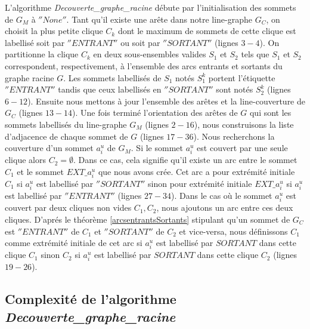 L'algorithme {\em Decouverte\_graphe\_racine} d\'ebute par l'initialisation des sommets de $G_M$ \`a $''None''$.
Tant qu'il existe une ar\^ete dans notre line-graphe $G_C$, on choisit la plus petite clique $C_k$ dont le maximum de sommets de cette clique est labellis\'e soit par $''ENTRANT''$ ou soit par $''SORTANT''$ (lignes $3-4$).
On partitionne la clique $C_k$  en deux sous-ensembles valides $S_1$ et $S_2$ tels que $S_1$ et $S_2$ correspondent, respectivement, \`a l'ensemble des arcs entrants et sortants du graphe racine $G$.
Les sommets labellis\'es de $S_1$ not\'es $S_1^k$ portent l'\'etiquette $''ENTRANT''$ tandis que ceux labellis\'es en $''SORTANT''$ sont not\'es $S_2^k$ (lignes $6-12$). 
Ensuite nous mettons \`a jour l'ensemble des ar\^etes et la line-couverture de $G_C$ (lignes $13-14$). 
\newline
Une fois termin\'e l'orientation des ar\^etes de $G$ qui  sont les sommets labellis\'es du line-graphe $G_M$ (lignes $2-16$), nous construisons la liste d'adjacence de chaque sommet de $G$ (lignes $17-36$).
Nous recherchons la couverture d'un sommet $a_i^u$ de $G_M$.
\newline 
Si le sommet  $a_i^u$ est couvert par une seule clique alors $C_2 = \emptyset$. Dans ce cas, cela signifie qu'il existe un arc entre le sommet $C_1$ et le sommet $EXT\_a_i^u$ que nous avons cr\'ee. Cet arc a pour extr\'emit\'e initiale $C_1$ si $a_i^u$ est labellis\'e par $''SORTANT''$ sinon pour extr\'emit\'e initiale $EXT\_a_i^u$ si $a_i^u$ est labellis\'e par $''ENTRANT''$ (lignes $27-34$).
\newline
Dans le cas o\`u le sommet $a_i^u$ est couvert par deux cliques non vides $C_1, C_2$, nous ajoutons un arc entre ces deux cliques.
D'apr\'es le th\'eor\`eme  \ref{arcsentrantsSortants} stipulant qu'un sommet de $G_C$ est $''ENTRANT''$ de $C_1$ et $''SORTANT''$ de $C_2$ et vice-versa, nous d\'efinissons  $C_1$ comme extr\'emit\'e initiale de cet arc si $a_i^u$ est labellis\'e par $SORTANT$ dans cette clique $C_1$ sinon $C_2$ si $a_i^u$ est labellis\'e par $SORTANT$ dans cette clique $C_2$ (lignes $19-26$).

\subsection{Complexit\'e de l'algorithme {\em Decouverte\_graphe\_racine} }

